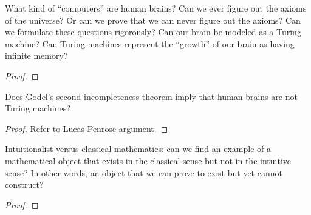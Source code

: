 \begin{question}
  What kind of ``computers'' are human brains? Can we ever figure out the
  axioms of the universe? Or can we prove that we can never figure out the
  axioms? Can we formulate these questions rigorously?  Can our brain be
  modeled as a Turing machine?  Can Turing machines represent the
  ``growth'' of our brain as having infinite memory?
\end{question}
\begin{proof}
\end{proof}

\begin{question}
  Does Godel's second incompleteness theorem imply that human brains are
  not Turing machines?
\end{question}
\begin{proof}
  Refer to Lucas-Penrose argument.
\end{proof}

\begin{question}
  Intuitionalist versus classical mathematics: can we find an example of a
  mathematical object that exists in the classical sense but not in the
  intuitive sense? In other words, an object that we can prove to exist but
  yet cannot construct? 
\end{question}
\begin{proof}
\end{proof}

